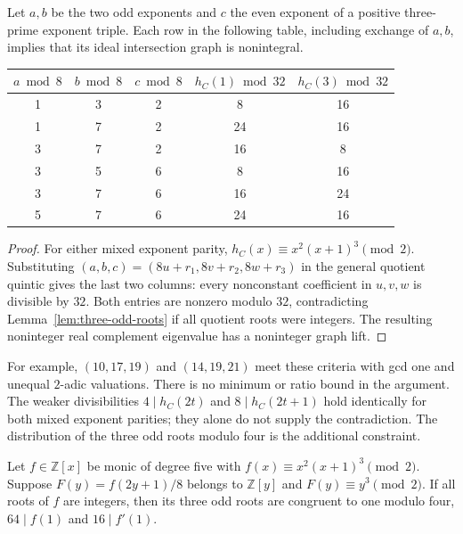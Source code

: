 \begin{proposition}
\label{thm:mixed-parity-congruence}
Let $a,b$ be the two odd exponents and $c$ the even exponent of a positive
three-prime exponent triple. Each row in the following table, including
exchange of $a,b$, implies that its ideal intersection graph is nonintegral.
\begin{center}
\begin{tabular}{ccc|cc}
\toprule
$a\bmod8$ & $b\bmod8$ & $c\bmod8$ & $h_C(1)\bmod32$ & $h_C(3)\bmod32$\\
\midrule
1&3&2&8&16\\
1&7&2&24&16\\
3&7&2&16&8\\
3&5&6&8&16\\
3&7&6&16&24\\
5&7&6&24&16\\
\bottomrule
\end{tabular}
\end{center}
\end{proposition}

\begin{proof}
For either mixed exponent parity,
$h_C(x)\equiv x^2(x+1)^3\pmod2$. Substituting
$(a,b,c)=(8u+r_1,8v+r_2,8w+r_3)$ in the general quotient quintic gives
the last two columns: every nonconstant coefficient in $u,v,w$ is
divisible by $32$. Both entries are nonzero modulo $32$, contradicting
Lemma~\ref{lem:three-odd-roots} if all quotient roots were integers.
The resulting noninteger real complement eigenvalue has a noninteger
graph lift.
\end{proof}

For example, $(10,17,19)$ and $(14,19,21)$ meet these criteria with
gcd one and unequal $2$-adic valuations. There is no minimum or ratio
bound in the argument. The weaker divisibilities $4\mid h_C(2t)$
and $8\mid h_C(2t+1)$ hold identically for both mixed exponent parities;
they alone do not supply the contradiction. The distribution of the
three odd roots modulo four is the additional constraint.

\begin{lemma}
\label{lem:odd-root-distribution}
Let $f\in\mathbb Z[x]$ be monic of degree five with
$f(x)\equiv x^2(x+1)^3\pmod2$. Suppose
$F(y)=f(2y+1)/8$ belongs to $\mathbb Z[y]$ and
$F(y)\equiv y^3\pmod2$. If all roots of $f$ are integers,
then its three odd roots are congruent to one modulo four,
$64\mid f(1)$ and $16\mid f'(1)$.
\end{lemma}

